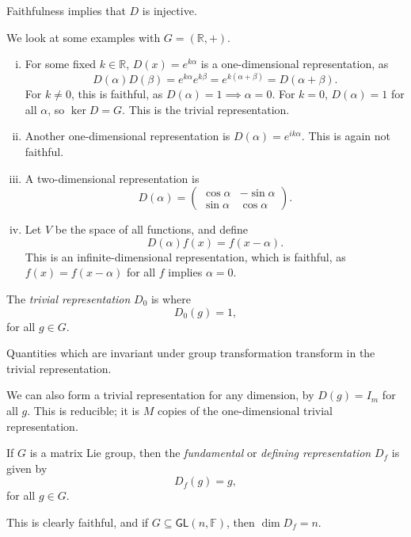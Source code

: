 \documentclass[12pt]{article}
\begin{document}
Faithfulness implies that $D$ is injective.

\begin{exbox}
	We look at some examples with $G = (\mathbb{R}, +)$.
	\begin{enumerate}[(i)]
		\item For some fixed $k \in \mathbb{R}$, $D(x) = e^{k \alpha}$ is a one-dimensional representation, as
			\[
			D(\alpha) D(\beta) = e^{k \alpha} e^{k \beta} = e^{k(\alpha + \beta)} = D(\alpha + \beta).
			\]
			For $k \neq 0$, this is faithful, as $D(\alpha) = 1 \implies \alpha = 0$. For $k = 0$, $D(\alpha) = 1$ for all $\alpha$, so $\ker D = G$. This is the trivial representation.
		\item Another one-dimensional representation is $D(\alpha) = e^{ik\alpha}$. This is again not faithful.
		\item A two-dimensional representation is
			\[
			D(\alpha) =
			\begin{pmatrix}
				\cos \alpha & - \sin \alpha \\
				\sin \alpha & \cos \alpha
			\end{pmatrix}.
			\]
		\item Let $V$ be the space of all functions, and define
			\[
			D(\alpha) f(x) = f(x - \alpha).
			\]
			This is an infinite-dimensional representation, which is faithful, as $f(x) = f(x - \alpha)$ for all $f$ implies $\alpha = 0$.		
	\end{enumerate}
\end{exbox}

\begin{definition}
	The \emph{trivial representation} $D_0$ is where
	\[
	D_0(g) = 1,
	\]
	for all $g \in G$.
\end{definition}

Quantities which are invariant under group transformation transform in the trivial representation.

We can also form a trivial representation for any dimension, by $D(g) = I_m$ for all $g$. This is reducible; it is $M$ copies of the one-dimensional trivial representation.

\begin{definition}
	If $G$ is a matrix Lie group, then the \emph{fundamental} or \emph{defining representation} $D_f$ is given by
	\[
	D_f(g) = g,
	\]
	for all $g \in G$.
\end{definition}

This is clearly faithful, and if $G \subseteq \mathsf{GL}(n, \mathbb{F})$, then $\dim D_f = n$.
\end{document}
